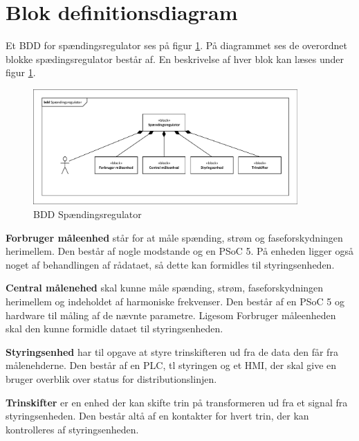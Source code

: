 
\section{Blok definitionsdiagram}
Et BDD for spændingsregulator ses på figur \ref{fig:BDDSpaendingsregulator}. På diagrammet ses de overordnet blokke spædingsregulator består af. En beskrivelse af hver blok kan læses under figur \ref{fig:BDDSpaendingsregulator}.

\begin{figure}[htbp] %
	\centering
	\includegraphics[width=0.9\textwidth]{Figure/BDDSpaendingsregulator}
	\caption{BDD Spændingsregulator}
	\label{fig:BDDSpaendingsregulator}
\end{figure}

\textbf{Forbruger måleenhed} står for at måle spænding, strøm og faseforskydningen herimellem. Den består af nogle modstande og en PSoC 5. På enheden ligger også noget af behandlingen af rådataet, så dette kan formidles til styringsenheden.

\textbf{Central målenehed} skal kunne måle spænding, strøm, faseforskydningen herimellem og indeholdet af harmoniske frekvenser. Den består af en PSoC 5 og hardware til måling af de nævnte parametre. Ligesom Forbruger måleenheden skal den kunne formidle dataet til styringsenheden.

\textbf{Styringsenhed} har til opgave at styre trinskifteren ud fra de data den får fra målenehderne. Den består af en PLC, tl styringen og et HMI, der skal give en bruger overblik over status for distributionslinjen.

\textbf{Trinskifter} er en enhed der kan skifte trin på transformeren ud fra et signal fra styringsenheden. Den består altå af en kontakter for hvert trin, der kan kontrolleres af styringsenheden.